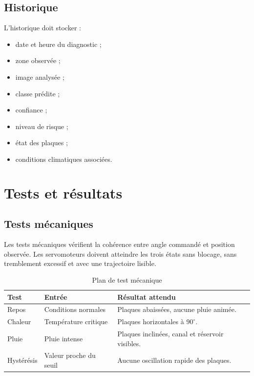 ﻿\documentclass[11pt,a4paper,openany]{report}
\begin{document}
\section{Historique}
L'historique doit stocker :
\begin{itemize}
  \item date et heure du diagnostic ;
  \item zone observée ;
  \item image analysée ;
  \item classe prédite ;
  \item confiance ;
  \item niveau de risque ;
  \item état des plaques ;
  \item conditions climatiques associées.
\end{itemize}

\chapter{Tests et résultats}
\section{Tests mécaniques}
Les tests mécaniques vérifient la cohérence entre angle commandé et position observée. Les servomoteurs doivent atteindre les trois états sans blocage, sans tremblement excessif et avec une trajectoire lisible.

\begin{table}[H]
\centering
\renewcommand{\arraystretch}{1.3}

\begin{tabular}{|p{2.5cm}|p{3cm}|p{7cm}|}
\hline
\textbf{Test} &
\textbf{Entrée} &
\textbf{Résultat attendu} \\
\hline

Repos &
Conditions normales &
Plaques abaissées, aucune pluie animée. \\
\hline

Chaleur &
Température critique &
Plaques horizontales à $90^\circ$. \\
\hline

Pluie &
Pluie intense &
Plaques inclinées, canal et réservoir visibles. \\
\hline

Hystérésis &
Valeur proche du seuil &
Aucune oscillation rapide des plaques. \\
\hline

\end{tabular}

\caption{Plan de test mécanique}
\label{tab:test_meca}
\end{table}
\end{document}
